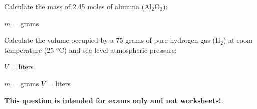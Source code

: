

Calculate the mass of 2.45 moles of alumina (Al$_{2}$O$_{3}$):

\vskip 10pt

$m$ = \underbar{\hskip 50pt} grams

\vskip 20pt

Calculate the volume occupied by a 75 grams of pure hydrogen gas (H$_{2}$) at room temperature (25 $^{o}$C) and sea-level atmospheric pressure:

\vskip 10pt

$V$ = \underbar{\hskip 50pt} liters







$m$ =  grams  \hskip 30pt  $V$ =  liters







{\bf This question is intended for exams only and not worksheets!}.


